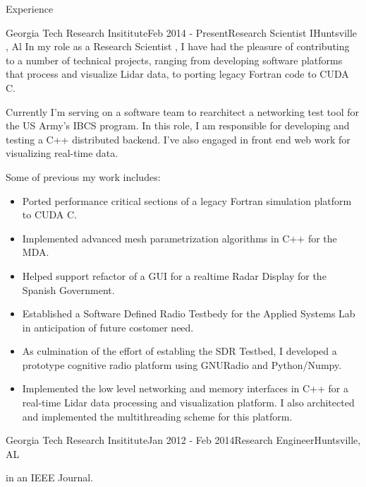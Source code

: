 \documentclass{resume} %
\begin{document}

\begin{rSection}{Experience}

\begin{rSubsection}{Georgia Tech Research Insititute}{Feb 2014 - Present}{Research Scientist I}{Huntsville , Al}
In my role as a Research Scientist , I have had the pleasure of contributing to a number of technical projects, ranging from
developing software platforms that process and visualize Lidar data, to porting legacy Fortran code to CUDA C. 

Currently I'm serving on a software team to rearchitect a networking test tool for the US Army's IBCS program. In this role, I
am responsible for developing and  testing a C++ distributed backend. I've also engaged in front end web work for visualizing
real-time data.

Some of previous my work includes:
\begin{itemize}
 \item Ported  performance critical sections of a legacy Fortran  simulation platform to CUDA C.
\item Implemented advanced mesh parametrization algorithms in C++ for the MDA.
\item Helped support refactor of a GUI for a realtime Radar Display for the Spanish Government.
\item Established a Software Defined Radio Testbedy for the Applied Systems Lab in anticipation of future costomer need.
\item As culmination of the effort of establing the SDR Testbed, I developed a prototype cognitive radio  platform using GNURadio and Python/Numpy.
\item Implemented the low level networking and memory interfaces in C++ for a real-time Lidar data processing and visualization platform. I also architected and implemented the multithreading scheme for this platform.
\end{itemize}
\end{rSubsection}

\begin{rSubsection}{Georgia Tech Research Insititute}{Jan  2012 - Feb 2014}{Research Engineer}{Huntsville, AL}

\item in an IEEE Journal.




\end{rSubsection}
\end{rSection}
\end{document}
